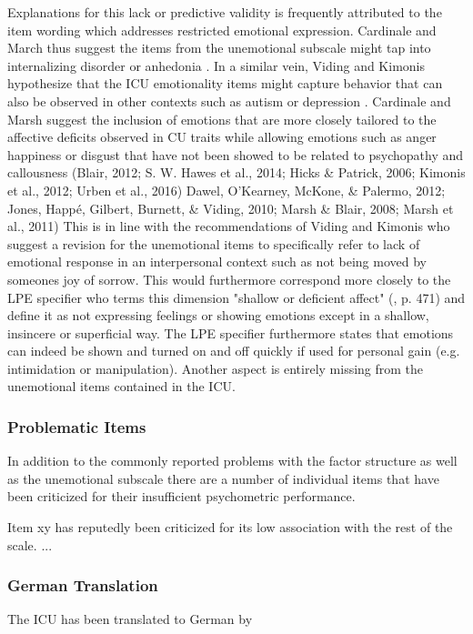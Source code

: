 Explanations for this lack or predictive validity is frequently attributed to the item wording which addresses restricted emotional expression. 
Cardinale and March thus suggest the items from the unemotional subscale might tap into internalizing disorder or anhedonia  \parencite*{cardinale_reliability_2017}.
In a similar vein, Viding and Kimonis hypothesize that the ICU emotionality items might capture behavior that can also be observed in other contexts such as autism or depression \parencite*{viding_callousunemotional_2018}. 
Cardinale and Marsh suggest the inclusion of emotions that are more closely tailored to the affective deficits observed in CU traits while allowing emotions such as anger happiness or disgust that have not been showed to be related to psychopathy and callousness (Blair, 2012; S. W. Hawes et al., 2014; Hicks \& Patrick, 
2006; Kimonis et al., 2012; Urben et al., 2016) Dawel, O’Kearney, McKone, \& Palermo, 
2012; Jones, Happé, Gilbert, Burnett, \& Viding, 2010; 
Marsh \& Blair, 2008; Marsh et al., 2011)  
This is in line with the recommendations of Viding and Kimonis who suggest a revision for the unemotional items to specifically
refer to lack of emotional response in an interpersonal context such as not being moved by someones joy of sorrow.
This would furthermore correspond more closely to the LPE specifier who terms this dimension "shallow or deficient affect" (, p. 471)
and define it as  not expressing feelings or showing emotions except in a shallow, insincere or superficial way. 
The LPE specifier furthermore states that emotions can indeed be shown and turned on and off quickly if used for personal gain (e.g. intimidation or manipulation). 
Another aspect is entirely missing from the unemotional items contained in the ICU.


\subsubsection{Problematic Items}
In addition to the commonly reported problems with the factor structure as well as the unemotional subscale there are a number of individual items that have been criticized for their
insufficient psychometric performance.

Item xy 
has reputedly been criticized for its low association with the rest of the scale. ...

\subsubsection{German Translation}
The ICU has been translated to German by 



